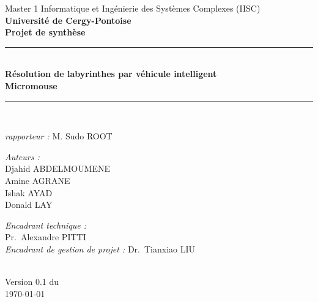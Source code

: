 \begin{titlepage}

\begin{center}

\AddToShipoutPicture*{\BackgroundPic}

{\large Master 1 Informatique et Ingénierie des Systèmes Complexes (IISC)}\\[0.5cm]

{\large \textbf{Université de Cergy-Pontoise}}\\[1.5cm]

{\large \textbf{Projet de synthèse}}\\[0.5cm]

\rule{\linewidth}{0.5mm} \\[0.4cm]
{ 
    \huge \bfseries Résolution de labyrinthes par véhicule intelligent \\[0.5cm]
    \huge Micromouse\\[0.4cm]
}
\rule{\linewidth}{0.5mm} \\[0.5cm]

\begin{center}
\begin{minipage}{0.5\textwidth}
   \large
    \emph{rapporteur :}
    M. Sudo \textsc{ROOT}
\end{minipage}%
\end{center}

\vspace{5mm}
\noindent
\begin{minipage}{0.5\textwidth}
  \begin{flushleft} \large
    \emph{Auteurs :}\\
    Djahid \textsc{ABDELMOUMENE}\\
    Amine \textsc{AGRANE}\\
    Ishak \textsc{AYAD}\\
    Donald \textsc{LAY}
  \end{flushleft}
\end{minipage}%
\begin{minipage}{0.5\textwidth}
  \begin{flushright} \large
    \emph{Encadrant technique :} \\
    Pr.~Alexandre \textsc{PITTI}\\
    \emph{Encadrant de gestion de projet :}
    Dr.~Tianxiao \textsc{LIU}
  \end{flushright}
\end{minipage}

 \\

\vspace*{\fill}
{\large Version 0.1 du\\ \today}

\end{center}
\end{titlepage}
